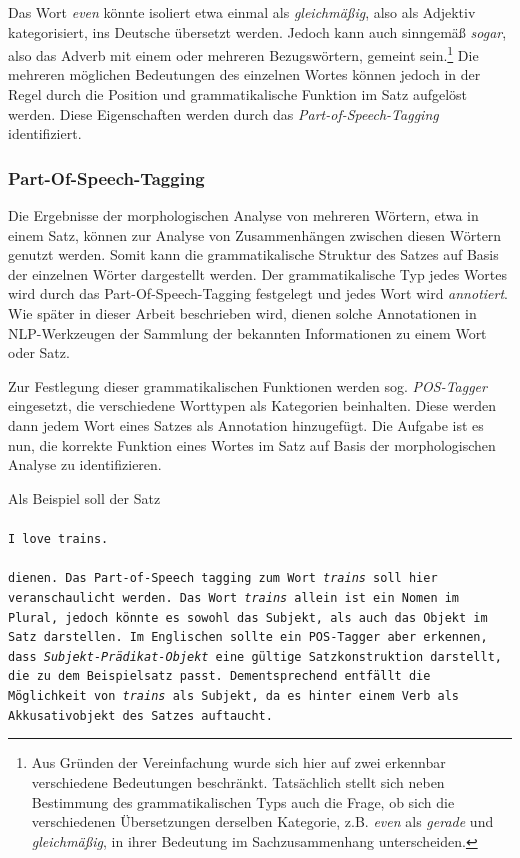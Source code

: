 \documentclass[12pt]{report}
\begin{document}
Das Wort \glqq \textit{even}\grqq{} könnte isoliert etwa einmal als \textit{gleichmäßig}, also als Adjektiv kategorisiert, ins Deutsche übersetzt werden. Jedoch kann auch sinngemäß \textit{sogar}, also das Adverb mit einem oder mehreren Bezugswörtern, gemeint sein.\footnote{Aus Gründen der Vereinfachung wurde sich hier auf zwei erkennbar verschiedene Bedeutungen beschränkt. Tatsächlich stellt sich neben Bestimmung des grammatikalischen Typs auch die Frage, ob sich die verschiedenen Übersetzungen derselben Kategorie, z.B. \textit{even} als \textit{gerade} und \textit{gleichmäßig}, in ihrer Bedeutung im Sachzusammenhang unterscheiden.} Die mehreren möglichen Bedeutungen des einzelnen Wortes können jedoch in der Regel durch die Position und grammatikalische Funktion im Satz aufgelöst werden. Diese Eigenschaften werden durch das \textit{Part-of-Speech-Tagging} identifiziert.

\subsubsection{Part-Of-Speech-Tagging}
Die Ergebnisse der morphologischen Analyse von mehreren Wörtern, etwa in einem Satz, können zur Analyse von Zusammenhängen zwischen diesen Wörtern genutzt werden. Somit kann die grammatikalische Struktur des Satzes auf Basis der einzelnen Wörter dargestellt werden. Der grammatikalische Typ jedes Wortes wird durch das Part-Of-Speech-Tagging festgelegt und jedes Wort wird \textit{annotiert}. Wie später in dieser Arbeit beschrieben wird, dienen solche Annotationen in NLP-Werkzeugen der Sammlung der bekannten Informationen zu einem Wort oder Satz. 

Zur Festlegung dieser grammatikalischen Funktionen werden sog. \textit{POS-Tagger} eingesetzt, die verschiedene Worttypen als Kategorien beinhalten. Diese werden dann jedem Wort eines Satzes als Annotation hinzugefügt. Die Aufgabe ist es nun, die korrekte Funktion eines Wortes im Satz auf Basis der morphologischen Analyse zu identifizieren. 

Als Beispiel soll der Satz 
\\
\tt
\\I love trains.\\
\\ \rm 
dienen. Das Part-of-Speech tagging zum Wort \glqq \textit{trains}\grqq{} soll hier veranschaulicht werden. Das Wort \glqq \textit{trains}\grqq{} allein ist ein Nomen im Plural, jedoch könnte es sowohl das Subjekt, als auch das Objekt im Satz darstellen. Im Englischen sollte ein POS-Tagger aber erkennen, dass \textit{Subjekt-Prädikat-Objekt} eine gültige Satzkonstruktion darstellt, die zu dem Beispielsatz passt. Dementsprechend entfällt die Möglichkeit von \textit{trains} als Subjekt, da es hinter einem Verb als Akkusativobjekt des Satzes auftaucht.
\end{document}
